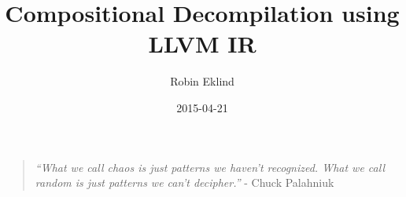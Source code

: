 \documentclass[12pt, a4paper]{article}
\title{Compositional Decompilation using LLVM IR}
\author{Robin Eklind}
\date{2015-04-21}
\begin{document}



%


\maketitle



\vfill

\begin{quote}
	\textit{``What we call chaos is just patterns we haven't recognized. What we call random is just patterns we can't decipher.''} - Chuck Palahniuk \cite{patterns_quote}
\end{quote}

\clearpage


%


\tableofcontents

\clearpage




















\end{document}
